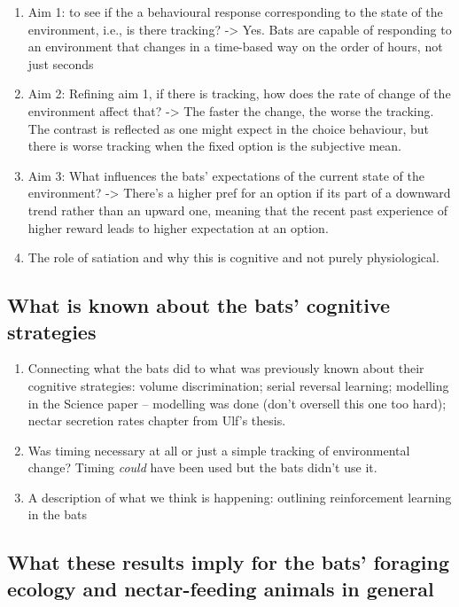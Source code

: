 \documentclass[
]{article}
\providecommand{\tightlist}{%
  \setlength{\itemsep}{0pt}\setlength{\parskip}{0pt}}
\begin{document}
\begin{enumerate}
\def\labelenumi{\arabic{enumi}.}
\tightlist
\item
  Aim 1: to see if the a behavioural response corresponding to the state of the environment, i.e., is there tracking? -\textgreater{} Yes. Bats are capable of responding to an environment that changes in a time-based way on the order of hours, not just seconds
\item
  Aim 2: Refining aim 1, if there is tracking, how does the rate of change of the environment affect that? -\textgreater{} The faster the change, the worse the tracking. The contrast is reflected as one might expect in the choice behaviour, but there is worse tracking when the fixed option is the subjective mean.
\item
  Aim 3: What influences the bats' expectations of the current state of the environment? -\textgreater{} There's a higher pref for an option if its part of a downward trend rather than an upward one, meaning that the recent past experience of higher reward leads to higher expectation at an option.
\item
  The role of satiation and why this is cognitive and not purely physiological.
\end{enumerate}

\hypertarget{what-is-known-about-the-bats-cognitive-strategies}{%
\subsection{What is known about the bats' cognitive strategies}\label{what-is-known-about-the-bats-cognitive-strategies}}

\begin{enumerate}
\def\labelenumi{\arabic{enumi}.}
\tightlist
\item
  Connecting what the bats did to what was previously known about their cognitive strategies: volume discrimination; serial reversal learning; modelling in the Science paper -- modelling was done (don't oversell this one too hard); nectar secretion rates chapter from Ulf's thesis.
\item
  Was timing necessary at all or just a simple tracking of environmental change? Timing \emph{could} have been used but the bats didn't use it.
\item
  A description of what we think is happening: outlining reinforcement learning in the bats
\end{enumerate}

\hypertarget{what-these-results-imply-for-the-bats-foraging-ecology-and-nectar-feeding-animals-in-general}{%
\subsection{What these results imply for the bats' foraging ecology and nectar-feeding animals in general}\label{what-these-results-imply-for-the-bats-foraging-ecology-and-nectar-feeding-animals-in-general}}
\end{document}
